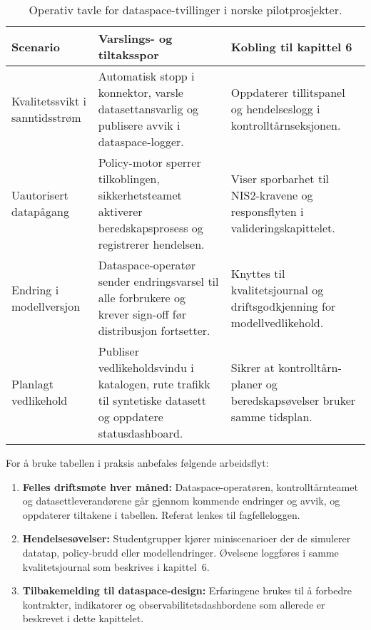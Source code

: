 \begin{table}[ht]
    \centering
    \caption{Operativ tavle for dataspace-tvillinger i norske pilotprosjekter.}
    \label{tab:kap03-dataspace-drift}
    \begin{tabular}{p{}p{}p{}}
        \toprule
        \textbf{Scenario} & \textbf{Varslings- og tiltaksspor} & \textbf{Kobling til kapittel 6} \\
        \midrule
        Kvalitetssvikt i sanntidsstrøm & Automatisk stopp i konnektor, varsle datasettansvarlig og publisere avvik i dataspace-logger. & Oppdaterer tillitspanel og hendelseslogg i kontrolltårnseksjonen. \\
        Uautorisert datapågang & Policy-motor sperrer tilkoblingen, sikkerhetsteamet aktiverer beredskapsprosess og registrerer hendelsen. & Viser sporbarhet til NIS2-kravene og responsflyten i valideringskapittelet. \\
        Endring i modellversjon & Dataspace-operatør sender endringsvarsel til alle forbrukere og krever sign-off før distribusjon fortsetter. & Knyttes til kvalitetsjournal og driftsgodkjenning for modellvedlikehold. \\
        Planlagt vedlikehold & Publiser vedlikeholdsvindu i katalogen, rute trafikk til syntetiske datasett og oppdatere statusdashboard. & Sikrer at kontrolltårn-planer og beredskapsøvelser bruker samme tidsplan. \\
        \bottomrule
    \end{tabular}
\end{table}

For å bruke tabellen i praksis anbefales følgende arbeidsflyt:
\begin{enumerate}
    \item \textbf{Felles driftsmøte hver måned:} Dataspace-operatøren, kontrolltårnteamet og datasettleverandørene går gjennom
    kommende endringer og avvik, og oppdaterer tiltakene i tabellen. Referat lenkes til fagfelleloggen.
    \item \textbf{Hendelsesøvelser:} Studentgrupper kjører miniscenarioer der de simulerer datatap, policy-brudd eller modellendringer.
    Øvelsene loggføres i samme kvalitetsjournal som beskrives i kapittel~6.
    \item \textbf{Tilbakemelding til dataspace-design:} Erfaringene brukes til å forbedre kontrakter, indikatorer og
    observabilitetsdashbordene som allerede er beskrevet i dette kapittelet.
\end{enumerate}

